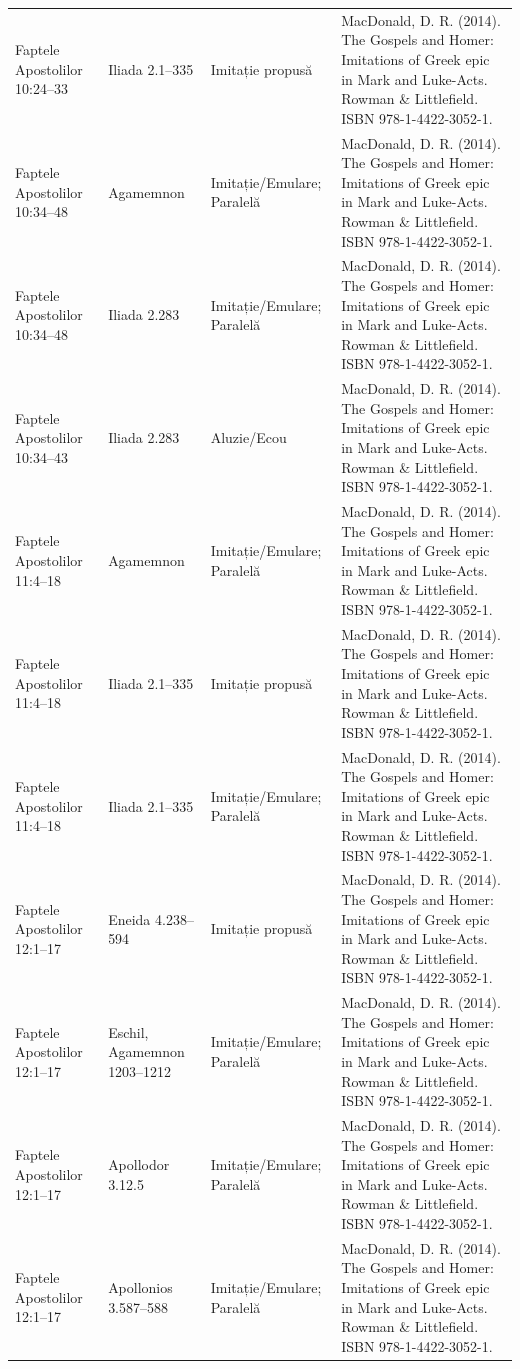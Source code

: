 \documentclass[12pt,a4paper,twoside,openany]{book}
\begin{document}
\begin{longtable}{L{1.4cm}L{1.7cm}L{3.1cm}L{8.4cm}}
Faptele Apostolilor 10:24–33 & Iliada 2.1–335 & Imitație propusă & MacDonald, D. R. (2014). The Gospels and Homer: Imitations of Greek epic in Mark and Luke-Acts. Rowman \& Littlefield. ISBN 978-1-4422-3052-1. \\
Faptele Apostolilor 10:34–48 & Agamemnon & Imitație/Emulare; Paralelă & MacDonald, D. R. (2014). The Gospels and Homer: Imitations of Greek epic in Mark and Luke-Acts. Rowman \& Littlefield. ISBN 978-1-4422-3052-1. \\
Faptele Apostolilor 10:34–48 & Iliada 2.283 & Imitație/Emulare; Paralelă & MacDonald, D. R. (2014). The Gospels and Homer: Imitations of Greek epic in Mark and Luke-Acts. Rowman \& Littlefield. ISBN 978-1-4422-3052-1. \\
Faptele Apostolilor 10:34–43 & Iliada 2.283 & Aluzie/Ecou & MacDonald, D. R. (2014). The Gospels and Homer: Imitations of Greek epic in Mark and Luke-Acts. Rowman \& Littlefield. ISBN 978-1-4422-3052-1. \\
Faptele Apostolilor 11:4–18 & Agamemnon & Imitație/Emulare; Paralelă & MacDonald, D. R. (2014). The Gospels and Homer: Imitations of Greek epic in Mark and Luke-Acts. Rowman \& Littlefield. ISBN 978-1-4422-3052-1. \\
Faptele Apostolilor 11:4–18 & Iliada 2.1–335 & Imitație propusă & MacDonald, D. R. (2014). The Gospels and Homer: Imitations of Greek epic in Mark and Luke-Acts. Rowman \& Littlefield. ISBN 978-1-4422-3052-1. \\
Faptele Apostolilor 11:4–18 & Iliada 2.1–335 & Imitație/Emulare; Paralelă & MacDonald, D. R. (2014). The Gospels and Homer: Imitations of Greek epic in Mark and Luke-Acts. Rowman \& Littlefield. ISBN 978-1-4422-3052-1. \\
Faptele Apostolilor 12:1–17 & Eneida 4.238–594 & Imitație propusă & MacDonald, D. R. (2014). The Gospels and Homer: Imitations of Greek epic in Mark and Luke-Acts. Rowman \& Littlefield. ISBN 978-1-4422-3052-1. \\
Faptele Apostolilor 12:1–17 & Eschil, Agamemnon 1203–1212 & Imitație/Emulare; Paralelă & MacDonald, D. R. (2014). The Gospels and Homer: Imitations of Greek epic in Mark and Luke-Acts. Rowman \& Littlefield. ISBN 978-1-4422-3052-1. \\
Faptele Apostolilor 12:1–17 & Apollodor 3.12.5 & Imitație/Emulare; Paralelă & MacDonald, D. R. (2014). The Gospels and Homer: Imitations of Greek epic in Mark and Luke-Acts. Rowman \& Littlefield. ISBN 978-1-4422-3052-1. \\
Faptele Apostolilor 12:1–17 & Apollonios 3.587–588 & Imitație/Emulare; Paralelă & MacDonald, D. R. (2014). The Gospels and Homer: Imitations of Greek epic in Mark and Luke-Acts. Rowman \& Littlefield. ISBN 978-1-4422-3052-1. \\

\end{longtable}
\end{document}
